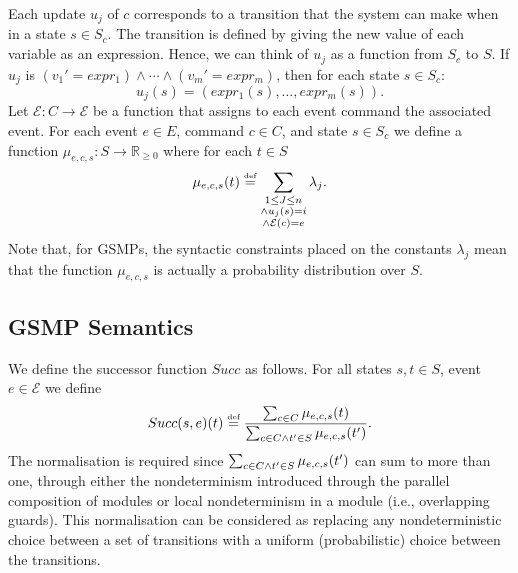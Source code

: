 \documentclass{article}
\newcommand{\eqdef}{\ensuremath{\stackrel{\text{\tiny def}}{=}}}
\newcommand{\Rsetpo}{\mathbb{R}_{\ge 0}}
\newcommand{\calE}{\mathcal{E}}
\renewcommand{\_}{\underline{~}}
\newcommand{\events}{{\calE}}
\newcommand{\suc}{Succ}
\begin{document}
Each update $u_j$ of $c$ corresponds to a transition that the system can make when in a state $s \in S_c$. 
The transition is defined by giving the new value of each variable as an expression.
Hence, we can think of $u_j$ as a function from $S_c$ to $S$. 
If $u_j$ is $(v_1' = expr_1)\wedge \cdots \wedge (v_m'
= expr_m)$, then for each state $s \in S_c$:
$$ u_j(s) = (expr_1(s), \ldots, expr_m(s)). $$
%
%
Let $\mathcal{E}\colon C \to \events $ be a function that assigns to each event command the associated event. 
For each event $e \in E$, command $c \in C$, and state $s \in S_c$ we define a function $\mu_{e,c,s} \colon S \to \mathbb{R}_{\geq0}$ where for each $t\in S$ 
\[ \mu_{e,c,s}(t) \eqdef \sum_{\substack{
		1 \leq J \leq n \\
		\wedge u_j(s) = i \\
		\wedge \mathcal{E}(c)=e}} \lambda_j. \]
Note that, for GSMPs, the syntactic constraints placed on the constants $\lambda_j$ mean
that the function $\mu_{e,c,s}$ is actually a probability distribution over $S$.


\subsection*{GSMP Semantics}
We define the successor function $\suc$ as follows.
For all states $s,t\in S$, event $e \in \mathcal{E}$ we define
\[\suc(s,e)(t) \eqdef \frac{\sum_{c \in C} \mu_{e,c,s}(t)}{\sum_{c \in C \\ \wedge t'\in S} \mu_{e,c,s}(t')}. \]
The normalisation is required since $\sum_{c \in C \\ \wedge t'\in S} \mu_{e,c,s}(t')$ can sum to more than one, through either the nondeterminism introduced through the parallel composition of modules or local nondeterminism in a module (i.e., overlapping guards). 
This normalisation can be considered as replacing any nondeterministic choice between a set of transitions with a uniform (probabilistic) choice between the transitions.
\end{document}
